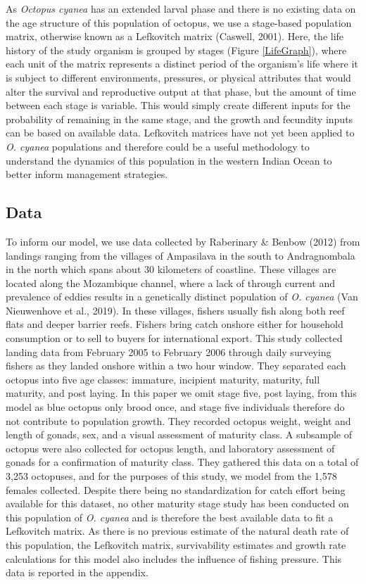 \documentclass[
]{article}
\begin{document}
As \emph{Octopus cyanea} has an extended larval phase and there is no existing data on the age structure of this population of octopus, we use a stage-based population matrix, otherwise known as a Lefkovitch matrix (Caswell, 2001). Here, the life history of the study organism is grouped by stages (Figure \ref{LifeGraph}), where each unit of the matrix represents a distinct period of the organism's life where it is subject to different environments, pressures, or physical attributes that would alter the survival and reproductive output at that phase, but the amount of time between each stage is variable. This would simply create different inputs for the probability of remaining in the same stage, and the growth and fecundity inputs can be based on available data. Lefkovitch matrices have not yet been applied to \emph{O. cyanea} populations and therefore could be a useful methodology to understand the dynamics of this population in the western Indian Ocean to better inform management strategies.

\hypertarget{data}{%
\subsection{Data}\label{data}}

To inform our model, we use data collected by Raberinary \& Benbow (2012) from landings ranging from the villages of Ampasilava in the south to Andragnombala in the north which spans about 30 kilometers of coastline. These villages are located along the Mozambique channel, where a lack of through current and prevalence of eddies results in a genetically distinct population of \emph{O. cyanea} (Van Nieuwenhove et al., 2019). In these villages, fishers usually fish along both reef flats and deeper barrier reefs. Fishers bring catch onshore either for household consumption or to sell to buyers for international export. This study collected landing data from February 2005 to February 2006 through daily surveying fishers as they landed onshore within a two hour window. They separated each octopus into five age classes: immature, incipient maturity, maturity, full maturity, and post laying. In this paper we omit stage five, post laying, from this model as blue octopus only brood once, and stage five individuals therefore do not contribute to population growth. They recorded octopus weight, weight and length of gonads, sex, and a visual assessment of maturity class. A subsample of octopus were also collected for octopus length, and laboratory assessment of gonads for a confirmation of maturity class. They gathered this data on a total of 3,253 octopuses, and for the purposes of this study, we model from the 1,578 females collected. Despite there being no standardization for catch effort being available for this dataset, no other maturity stage study has been conducted on this population of \emph{O. cyanea} and is therefore the best available data to fit a Lefkovitch matrix. As there is no previous estimate of the natural death rate of this population, the Lefkovitch matrix, survivability estimates and growth rate calculations for this model also includes the influence of fishing pressure. This data is reported in the appendix.
\end{document}
